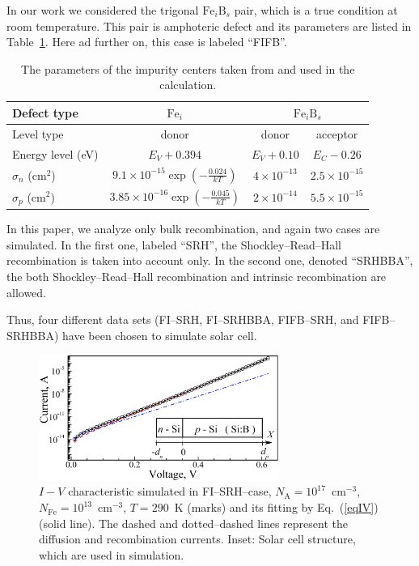 \documentclass [sort&compress] {elsarticle}
\begin{document}
In our work we considered the trigonal $\mathrm{Fe}_i\mathrm{B}_s$  pair, which is a true condition at room temperature.
This pair is amphoteric defect
and its parameters are listed in Table~\ref{tabDefect}.
Here ad further on, this case is labeled ``FIFB''.


\begin{table}
\caption{\label{tabDefect}The parameters of the impurity centers taken from \cite{Istratov1999,Rein2,MurphyJAP2011,FeB:kinetic} and used in the calculation.
}
\begin{tabular}{lccc}
\hline
\hline
Defect type&$\mathrm{Fe}_i$&\multicolumn{2}{c}{$\mathrm{Fe}_i\mathrm{B}_s$}\\
\hline
Level type&donor&donor&acceptor\\
Energy level (eV)&$E_V+0.394$&$E_V+0.10$&$E_C-0.26$\\
 $\sigma_{n}$ (cm$^2$)&$9.1\times10^{-15}\exp(-\frac{0.024}{kT})$&$4\times10^{-13}$&$2.5\times10^{-15}$\\
 $\sigma_{p}$ (cm$^2$)&$3.85\times10^{-16}\exp(-\frac{0.045}{kT})$&$2\times10^{-14}$&$5.5\times10^{-15}$\\
\hline
\hline
\end{tabular}
\end{table}


In this paper, we analyze only bulk recombination, and again two cases are simulated.
In the first one, labeled ``SRH'', the Shockley--Read--Hall recombination is taken into account only.
In the second one, denoted ``SRHBBA'', the both Shockley--Read--Hall recombination and intrinsic recombination are allowed.

Thus, four different data sets (FI--SRH, FI--SRHBBA, FIFB--SRH, and FIFB--SRHBBA)
have been chosen to simulate solar cell.


\begin{figure}
\includegraphics[width=0.7\textwidth]{Fig1}%
\caption{\label{figIV}
$I-V$ characteristic simulated in FI--SRH--case, $N_\mathrm{A}=10^{17}$~cm$^{-3}$,  $N_{\mathrm{Fe}}=10^{13}$~cm$^{-3}$, $T=290$~K (marks)
and its fitting by Eq.~(\ref{eqIV}) (solid line).
The dashed and dotted--dashed lines represent the diffusion and recombination currents.
Inset: Solar cell structure, which are used in simulation.
}%
\end{figure}
\end{document}
